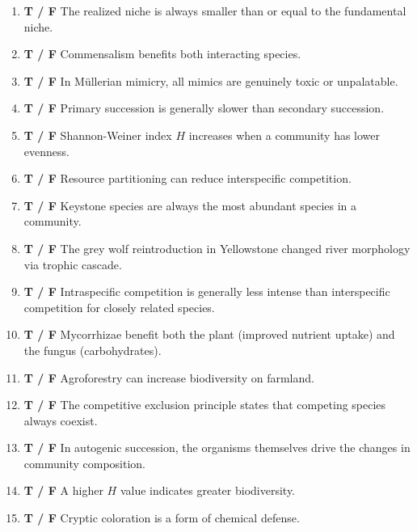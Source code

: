 \documentclass[11pt]{article}
\begin{document}
\begin{enumerate}[label=\textbf{\arabic*.}]
  \item \textbf{T / F} \underline{\phantom{XX}} The realized niche is always smaller than or equal to the fundamental niche.
  \item \textbf{T / F} \underline{\phantom{XX}} Commensalism benefits both interacting species.
  \item \textbf{T / F} \underline{\phantom{XX}} In M\"{u}llerian mimicry, all mimics are genuinely toxic or unpalatable.
  \item \textbf{T / F} \underline{\phantom{XX}} Primary succession is generally slower than secondary succession.
  \item \textbf{T / F} \underline{\phantom{XX}} Shannon-Weiner index $H$ increases when a community has lower evenness.
  \item \textbf{T / F} \underline{\phantom{XX}} Resource partitioning can reduce interspecific competition.
  \item \textbf{T / F} \underline{\phantom{XX}} Keystone species are always the most abundant species in a community.
  \item \textbf{T / F} \underline{\phantom{XX}} The grey wolf reintroduction in Yellowstone changed river morphology via trophic cascade.
  \item \textbf{T / F} \underline{\phantom{XX}} Intraspecific competition is generally less intense than interspecific competition for closely related species.
  \item \textbf{T / F} \underline{\phantom{XX}} Mycorrhizae benefit both the plant (improved nutrient uptake) and the fungus (carbohydrates).
  \item \textbf{T / F} \underline{\phantom{XX}} Agroforestry can increase biodiversity on farmland.
  \item \textbf{T / F} \underline{\phantom{XX}} The competitive exclusion principle states that competing species always coexist.
  \item \textbf{T / F} \underline{\phantom{XX}} In autogenic succession, the organisms themselves drive the changes in community composition.
  \item \textbf{T / F} \underline{\phantom{XX}} A higher $H$ value indicates greater biodiversity.
  \item \textbf{T / F} \underline{\phantom{XX}} Cryptic coloration is a form of chemical defense.
\end{enumerate}

\clearpage
\end{document}

